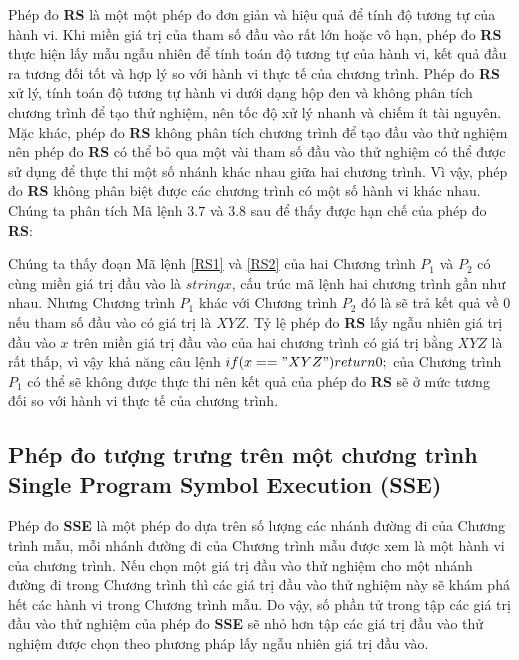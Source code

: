 Phép đo \textbf{RS} là một một phép đo đơn giản và hiệu quả để tính độ tương tự của hành vi. Khi miền giá trị của tham số đầu vào rất lớn hoặc vô hạn, phép đo \textbf{RS} thực hiện lấy mẫu ngẫu nhiên để tính toán độ tương tự của hành vi, kết quả đầu ra tương đối tốt và hợp lý so với hành vi thực tế của chương trình. Phép đo \textbf{RS} xử lý, tính toán độ tương tự hành vi dưới dạng hộp đen và không phân tích chương trình để tạo thử nghiệm, nên tốc độ xử lý nhanh và chiếm ít tài nguyên. Mặc khác, phép đo \textbf{RS} không phân tích chương trình để tạo đầu vào thử nghiệm nên phép đo \textbf{RS} có thể bỏ qua một vài tham số đầu vào thử nghiệm có thể được sử dụng để thực thi một số nhánh khác nhau giữa hai chương trình. Vì vậy, phép đo \textbf{RS} không phân biệt được các chương trình có một số hành vi khác nhau. Chúng ta phân tích Mã lệnh $3.7$ và $3.8$ sau để thấy được hạn chế của phép đo \textbf{RS}:

\begin{minipage}[t]{0.45\linewidth}
	
\end{minipage}%
\hfill\vrule\hfill
\begin{minipage}[t]{0.45\linewidth}
	
\end{minipage}%

Chúng ta thấy đoạn Mã lệnh \ref{RS1} và \ref{RS2} của hai Chương trình $P_{1}$ và $P_{2}$ có cùng miền giá trị đầu vào là $string x$, cấu trúc mã lệnh hai chương trình gần như nhau. Nhưng Chương trình $P_{1}$ khác với Chương trình $P_{2}$ đó là sẽ trả kết quả về $0$ nếu tham số đầu vào có giá trị là $XYZ$. Tỷ lệ phép đo \textbf{RS} lấy ngẫu nhiên giá trị đầu vào $x$ trên miền giá trị đầu vào của hai chương trình có giá trị bằng $XYZ$ là rất thấp, vì vậy khả năng câu lệnh $if (x == "XYZ") return 0;$ của Chương trình $P_{1}$ có thể sẽ không được thực thi nên kết quả của phép đo \textbf{RS} sẽ ở mức tương đối so với hành vi thực tế của chương trình.

\subsection{Phép đo tượng trưng trên một chương trình Single Program Symbol Execution (SSE)}
Phép đo \textbf{SSE} là một phép đo dựa trên số lượng các nhánh đường đi của Chương trình mẫu, mỗi nhánh đường đi của Chương trình mẫu được xem là một hành vi của chương trình. Nếu chọn một giá trị đầu vào thử nghiệm cho một nhánh đường đi trong Chương trình thì các giá trị đầu vào thử nghiệm này sẽ khám phá hết các hành vi trong Chương trình mẫu. Do vậy, số phần tử trong tập các giá trị đầu vào thử nghiệm của phép đo \textbf{SSE} sẽ nhỏ hơn tập các giá trị đầu vào thử nghiệm được chọn theo phương pháp lấy ngẫu nhiên giá trị đầu vào. 

